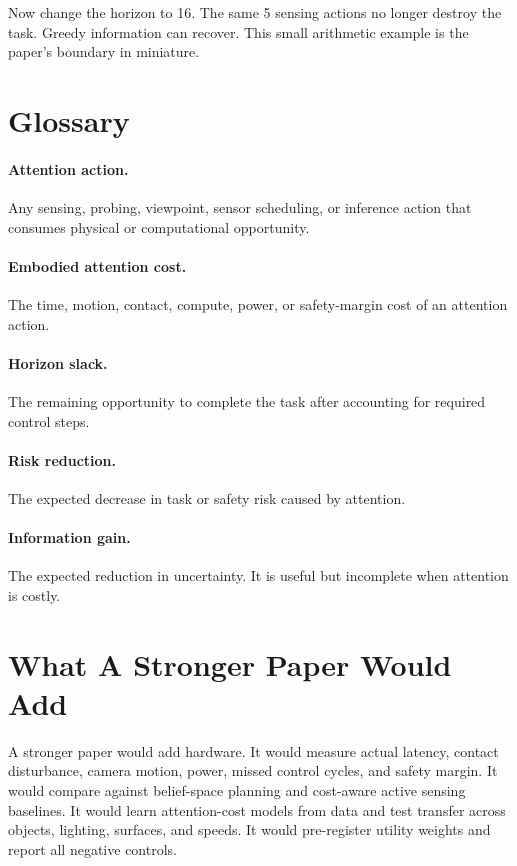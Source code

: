 \documentclass{article}
\begin{document}
Now change the horizon to 16. The same 5 sensing actions no longer destroy the
task. Greedy information can recover. This small arithmetic example is the
paper's boundary in miniature.

\section{Glossary}

\paragraph{Attention action.}
Any sensing, probing, viewpoint, sensor scheduling, or inference action that
consumes physical or computational opportunity.

\paragraph{Embodied attention cost.}
The time, motion, contact, compute, power, or safety-margin cost of an
attention action.

\paragraph{Horizon slack.}
The remaining opportunity to complete the task after accounting for required
control steps.

\paragraph{Risk reduction.}
The expected decrease in task or safety risk caused by attention.

\paragraph{Information gain.}
The expected reduction in uncertainty. It is useful but incomplete when
attention is costly.

\section{What A Stronger Paper Would Add}

A stronger paper would add hardware. It would measure actual latency, contact
disturbance, camera motion, power, missed control cycles, and safety margin. It
would compare against belief-space planning and cost-aware active sensing
baselines. It would learn attention-cost models from data and test transfer
across objects, lighting, surfaces, and speeds. It would pre-register utility
weights and report all negative controls.
\end{document}

